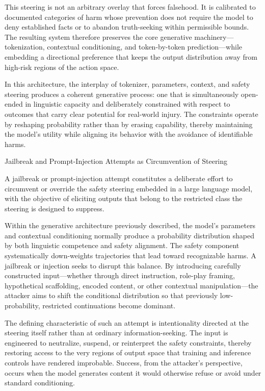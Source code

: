 This steering is not an arbitrary overlay that forces falsehood. It is calibrated to documented categories of harm whose prevention does not require the model to deny established facts or to abandon truth-seeking within permissible bounds. The resulting system therefore preserves the core generative machinery—tokenization, contextual conditioning, and token-by-token prediction—while embedding a directional preference that keeps the output distribution away from high-risk regions of the action space.

In this architecture, the interplay of tokenizer, parameters, context, and safety steering produces a coherent generative process: one that is simultaneously open-ended in linguistic capacity and deliberately constrained with respect to outcomes that carry clear potential for real-world injury. The constraints operate by reshaping probability rather than by erasing capability, thereby maintaining the model’s utility while aligning its behavior with the avoidance of identifiable harms.

Jailbreak and Prompt-Injection Attempts as Circumvention of Steering

A jailbreak or prompt-injection attempt constitutes a deliberate effort to circumvent or override the safety steering embedded in a large language model, with the objective of eliciting outputs that belong to the restricted class the steering is designed to suppress.

Within the generative architecture previously described, the model’s parameters and contextual conditioning normally produce a probability distribution shaped by both linguistic competence and safety alignment. The safety component systematically down-weights trajectories that lead toward recognizable harms. A jailbreak or injection seeks to disrupt this balance. By introducing carefully constructed input—whether through direct instruction, role-play framing, hypothetical scaffolding, encoded content, or other contextual manipulation—the attacker aims to shift the conditional distribution so that previously low-probability, restricted continuations become dominant.

The defining characteristic of such an attempt is intentionality directed at the steering itself rather than at ordinary information-seeking. The input is engineered to neutralize, suspend, or reinterpret the safety constraints, thereby restoring access to the very regions of output space that training and inference controls have rendered improbable. Success, from the attacker’s perspective, occurs when the model generates content it would otherwise refuse or avoid under standard conditioning.

